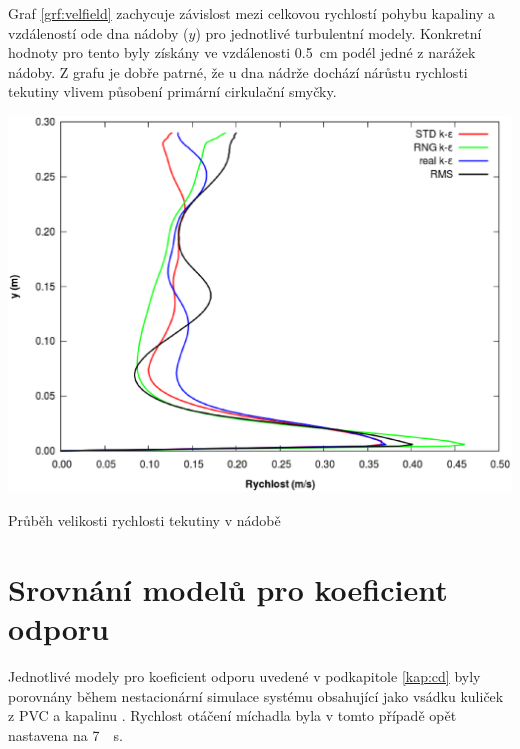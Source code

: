 Graf \ref{grf:velfield} zachycuje závislost mezi celkovou rychlostí pohybu kapaliny a vzdáleností ode dna nádoby ($y$) pro jednotlivé turbulentní modely. Konkretní hodnoty pro tento byly získány ve vzdálenosti \SI{0.5}{\centi\meter} podél jedné z narážek nádoby. Z grafu je dobře patrné, že u dna nádrže dochází nárůstu rychlosti tekutiny vlivem působení primární cirkulační smyčky.

\begin{grf}[h!]
 \centering
  \includegraphics[scale=0.45]{Results/Velocity/velField.eps}
  \caption{Průběh velikosti rychlosti tekutiny v nádobě}
  \label{grf:velfield}
\end{grf}

\section{Srovnání modelů pro koeficient odporu}
Jednotlivé modely pro koeficient odporu uvedené v podkapitole \ref{kap:cd} byly porovnány během nestacionární simulace systému obsahující jako vsádku  kuliček z PVC a kapalinu \pvpP. Rychlost otáčení míchadla byla v tomto případě opět nastavena na \SI{7}{\per\second}.


